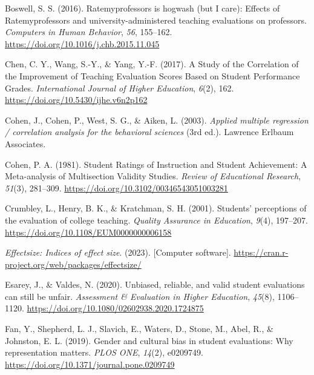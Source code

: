 \documentclass[
  man]{apa7}
\newlength{\cslhangindent}
\newlength{\cslentryspacingunit} %
\newenvironment{CSLReferences}[2] %
 {%
  \setlength{\parindent}{0pt}
  \ifodd #1
  \let\oldpar\par
  \def\par{\hangindent=\cslhangindent\oldpar}
  \fi
  \setlength{\parskip}{#2\cslentryspacingunit}
 }%
 {}
\begin{document}
\begin{CSLReferences}{1}{0}
\leavevmode{}%
Boswell, S. S. (2016). Ratemyprofessors is hogwash (but I care): Effects of Ratemyprofessors and university-administered teaching evaluations on professors. \emph{Computers in Human Behavior}, \emph{56}, 155--162. \url{https://doi.org/10.1016/j.chb.2015.11.045}

\leavevmode{}%
Chen, C. Y., Wang, S.-Y., \& Yang, Y.-F. (2017). A Study of the Correlation of the Improvement of Teaching Evaluation Scores Based on Student Performance Grades. \emph{International Journal of Higher Education}, \emph{6}(2), 162. \url{https://doi.org/10.5430/ijhe.v6n2p162}

\leavevmode{}%
Cohen, J., Cohen, P., West, S. G., \& Aiken, L. (2003). \emph{Applied multiple regression / correlation analysis for the behavioral sciences} (3rd ed.). Lawrence Erlbaum Associates.

\leavevmode{}%
Cohen, P. A. (1981). Student Ratings of Instruction and Student Achievement: A Meta-analysis of Multisection Validity Studies. \emph{Review of Educational Research}, \emph{51}(3), 281--309. \url{https://doi.org/10.3102/00346543051003281}

\leavevmode{}%
Crumbley, L., Henry, B. K., \& Kratchman, S. H. (2001). Students{'} perceptions of the evaluation of college teaching. \emph{Quality Assurance in Education}, \emph{9}(4), 197--207. \url{https://doi.org/10.1108/EUM0000000006158}

\leavevmode{}%
\emph{Effectsize: Indices of effect size}. (2023). {[}Computer software{]}. \url{https://cran.r-project.org/web/packages/effectsize/}

\leavevmode{}%
Esarey, J., \& Valdes, N. (2020). Unbiased, reliable, and valid student evaluations can still be unfair. \emph{Assessment \& Evaluation in Higher Education}, \emph{45}(8), 1106--1120. \url{https://doi.org/10.1080/02602938.2020.1724875}

\leavevmode{}%
Fan, Y., Shepherd, L. J., Slavich, E., Waters, D., Stone, M., Abel, R., \& Johnston, E. L. (2019). Gender and cultural bias in student evaluations: Why representation matters. \emph{PLOS ONE}, \emph{14}(2), e0209749. \url{https://doi.org/10.1371/journal.pone.0209749}


\end{CSLReferences}
\end{document}

